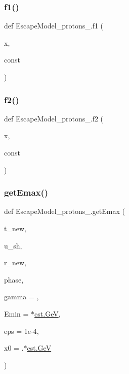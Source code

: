 \mbox{\label{namespaceEscapeModel__protons__2_a165a26137bf291cb3a220e21a0f48877}} 
\subsubsection{\texorpdfstring{f1()}{f1()}}
{\footnotesize\ttfamily def Escape\+Model\+\_\+protons\+\_.\+f1 (\begin{DoxyParamCaption}\item[{}]{x,  }\item[{}]{const }\end{DoxyParamCaption})}

\mbox{\label{namespaceEscapeModel__protons__2_aa6d6431275aed36f04a8441ba02fb152}} 
\subsubsection{\texorpdfstring{f2()}{f2()}}
{\footnotesize\ttfamily def Escape\+Model\+\_\+protons\+\_.\+f2 (\begin{DoxyParamCaption}\item[{}]{x,  }\item[{}]{const }\end{DoxyParamCaption})}

\mbox{\label{namespaceEscapeModel__protons__2_a178d4eb6e1bea7a052df9bc9680f3af4}} 
\subsubsection{\texorpdfstring{get\+Emax()}{getEmax()}}
{\footnotesize\ttfamily def Escape\+Model\+\_\+protons\+\_.\+get\+Emax (\begin{DoxyParamCaption}\item[{}]{t\+\_\+new,  }\item[{}]{u\+\_\+sh,  }\item[{}]{r\+\_\+new,  }\item[{}]{phase,  }\item[{}]{gamma = {},  }\item[{}]{Emin = {$\ast$\hyperlink{constants_8h_aec0e126d9991db8ad0b26139f5860568}{cst.\+GeV}},  }\item[{}]{eps = {\ttfamily 1e-\/4},  }\item[{}]{x0 = {.$\ast$\hyperlink{constants_8h_aec0e126d9991db8ad0b26139f5860568}{cst.\+GeV}} }\end{DoxyParamCaption})}

